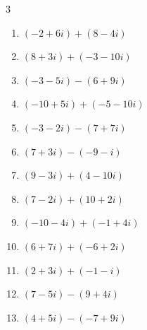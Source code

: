 \begin{multicols}{3}
\begin{enumerate}
  \item $\displaystyle (-2+6i) + (8-4i)$

        \phantom{$\displaystyle =6+2i$}

  \item $\displaystyle (8+3i) + (-3-10i)$

        \phantom{$\displaystyle =5-7i$}

  \item $\displaystyle (-3-5i) - (6+9i)$

        \phantom{$\displaystyle =-9-14i$}

  \item $\displaystyle (-10+5i) + (-5-10i)$

        \phantom{$\displaystyle =-15-5i$}

  \item $\displaystyle (-3-2i) - (7+7i)$

        \phantom{$\displaystyle =-10-9i$}

  \item $\displaystyle (7+3i) - (-9-i)$

        \phantom{$\displaystyle =16+4i$}

  \item $\displaystyle (9-3i) + (4-10i)$

        \phantom{$\displaystyle =13-13i$}

  \item $\displaystyle (7-2i) + (10+2i)$

        \phantom{$\displaystyle =17$}

  \item $\displaystyle (-10-4i) + (-1+4i)$

        \phantom{$\displaystyle =-11$}

  \item $\displaystyle (6+7i) + (-6+2i)$

        \phantom{$\displaystyle =9i$}

  \item $\displaystyle (2+3i) + (-1-i)$

        \phantom{$\displaystyle =1+2i$}

  \item $\displaystyle (7-5i) - (9+4i)$

        \phantom{$\displaystyle =-2-9i$}

  \item $\displaystyle (4+5i) - (-7+9i)$

        \phantom{$\displaystyle =11-4i$}


\end{enumerate}
\end{multicols}
